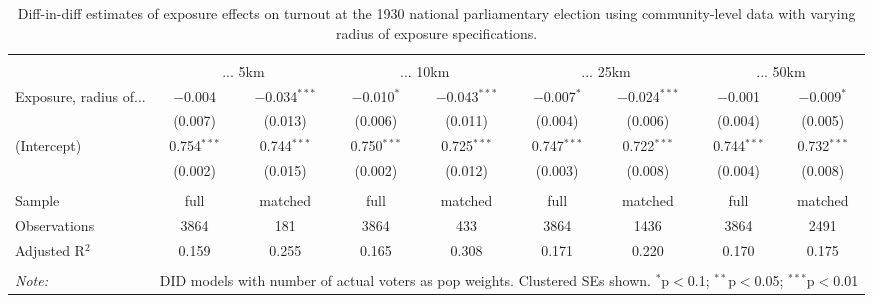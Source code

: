 
\begin{table}[!htbp] \centering 
  \caption{Diff-in-diff estimates of exposure effects on turnout at the 1930 national parliamentary election using community-level data with varying radius of exposure specifications.\vspace{-.25cm}} 
  \label{tab:turnout-radius-dd} 
\scriptsize 
\begin{tabular}{@{\extracolsep{5pt}}lcccccccc} 
\\[-1.8ex]\hline 
\hline \\[-1.8ex] 
 & \multicolumn{2}{c}{... 5km} & \multicolumn{2}{c}{... 10km} & \multicolumn{2}{c}{... 25km} & \multicolumn{2}{c}{... 50km} \\ 
 \cmidrule(r){2-3}\cmidrule(r){4-5}\cmidrule(r){6-7}\cmidrule(r){8-9}Exposure, radius of... & $-$0.004 & $-$0.034$^{***}$ & $-$0.010$^{*}$ & $-$0.043$^{***}$ & $-$0.007$^{*}$ & $-$0.024$^{***}$ & $-$0.001 & $-$0.009$^{*}$ \\ 
  & (0.007) & (0.013) & (0.006) & (0.011) & (0.004) & (0.006) & (0.004) & (0.005) \\ 
  (Intercept) & 0.754$^{***}$ & 0.744$^{***}$ & 0.750$^{***}$ & 0.725$^{***}$ & 0.747$^{***}$ & 0.722$^{***}$ & 0.744$^{***}$ & 0.732$^{***}$ \\ 
  & (0.002) & (0.015) & (0.002) & (0.012) & (0.003) & (0.008) & (0.004) & (0.008) \\ 
 \hline \\[-1.8ex] 
Sample & full & matched & full & matched & full & matched & full & matched \\ 
Observations & 3864 & 181 & 3864 & 433 & 3864 & 1436 & 3864 & 2491 \\ 
Adjusted R$^{2}$ & 0.159 & 0.255 & 0.165 & 0.308 & 0.171 & 0.220 & 0.170 & 0.175 \\ 
\hline 
\hline \\[-1.8ex] 
\textit{Note:}  & \multicolumn{8}{r}{DID models with number of actual voters as pop weights. Clustered SEs shown. $^{*}$p$<$0.1; $^{**}$p$<$0.05; $^{***}$p$<$0.01} \\ 
\end{tabular} 
\end{table} 
